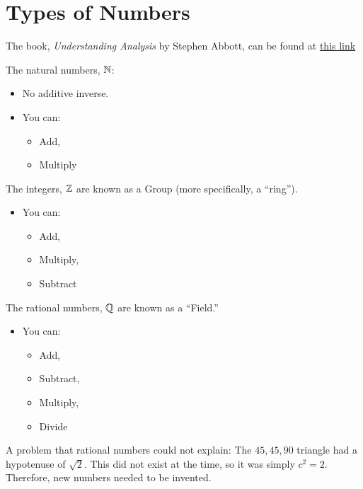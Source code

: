 \section{Types of Numbers}

The book, \textit{Understanding Analysis} by Stephen Abbott, can be found at \href{file:///C:/Users/paulb/OneDrive%20-%20Hendrix%20College/0.3%20Junior%20Year/Real%20Analysis%20(MATH%20350%2001)/2015_Book_UnderstandingAnalysis.pdf}{this link}

The \gls{natural numbers}, $\mathbb{N}$:
\begin{itemize}
    \item No additive inverse.
    \item You can:
    \begin{itemize}
        \item Add,
        \item Multiply
    \end{itemize}
\end{itemize}

The \gls{integers}, $\mathbb{Z}$ are known as a Group (more specifically, a ``ring'').

\begin{itemize}
    \item You can:
    \begin{itemize}
        \item Add,
        \item Multiply,
        \item Subtract
    \end{itemize}
\end{itemize}

The \gls{rational numbers}, $\mathbb{Q}$ are known as a ``Field.''

\begin{itemize}
    \item You can:
    \begin{itemize}
        \item Add,
        \item Subtract,
        \item Multiply,
        \item Divide
    \end{itemize}
\end{itemize}

A problem that rational numbers could not explain: The $45, 45, 90$ triangle had a hypotenuse of $\sqrt{2}$. This did not exist at the time, so it was simply $c^2 = 2$. Therefore, new numbers needed to be invented.

